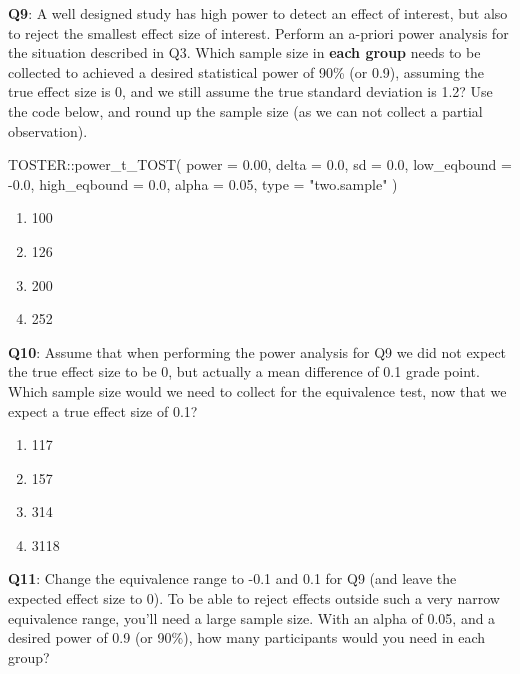 \documentclass[
  oneside]{book}
\newenvironment{Shaded}{\begin{snugshade}}{\end{snugshade}}
\newcommand{\AttributeTok}[1]{\textcolor[rgb]{0.77,0.63,0.00}{#1}}
\newcommand{\FloatTok}[1]{\textcolor[rgb]{0.00,0.00,0.81}{#1}}
\newcommand{\FunctionTok}[1]{\textcolor[rgb]{0.00,0.00,0.00}{#1}}
\newcommand{\NormalTok}[1]{#1}
\newcommand{\SpecialCharTok}[1]{\textcolor[rgb]{0.00,0.00,0.00}{#1}}
\newcommand{\StringTok}[1]{\textcolor[rgb]{0.31,0.60,0.02}{#1}}
\providecommand{\tightlist}{%
  \setlength{\itemsep}{0pt}\setlength{\parskip}{0pt}}
\begin{document}
\textbf{Q9}: A well designed study has high power to detect an effect of interest, but also to reject the smallest effect size of interest. Perform an a-priori power analysis for the situation described in Q3. Which sample size in \textbf{each group} needs to be collected to achieved a desired statistical power of 90\% (or 0.9), assuming the true effect size is 0, and we still assume the true standard deviation is 1.2? Use the code below, and round up the sample size (as we can not collect a partial observation).

\begin{Shaded}
\begin{Highlighting}[]
\NormalTok{TOSTER}\SpecialCharTok{::}\FunctionTok{power\_t\_TOST}\NormalTok{(}
  \AttributeTok{power =} \FloatTok{0.00}\NormalTok{,}
  \AttributeTok{delta =} \FloatTok{0.0}\NormalTok{,}
  \AttributeTok{sd =} \FloatTok{0.0}\NormalTok{,}
  \AttributeTok{low\_eqbound =} \SpecialCharTok{{-}}\FloatTok{0.0}\NormalTok{,}
  \AttributeTok{high\_eqbound =} \FloatTok{0.0}\NormalTok{,}
  \AttributeTok{alpha =} \FloatTok{0.05}\NormalTok{,}
  \AttributeTok{type =} \StringTok{"two.sample"}
\NormalTok{)}
\end{Highlighting}
\end{Shaded}

\begin{enumerate}
\def\labelenumi{\Alph{enumi})}
\tightlist
\item
  100
\item
  126
\item
  200
\item
  252
\end{enumerate}

\textbf{Q10}: Assume that when performing the power analysis for Q9 we did not expect the true effect size to be 0, but actually a mean difference of 0.1 grade point. Which sample size would we need to collect for the equivalence test, now that we expect a true effect size of 0.1?

\begin{enumerate}
\def\labelenumi{\Alph{enumi})}
\tightlist
\item
  117
\item
  157
\item
  314
\item
  3118
\end{enumerate}

\textbf{Q11}: Change the equivalence range to -0.1 and 0.1 for Q9 (and leave the expected effect size to 0). To be able to reject effects outside such a very narrow equivalence range, you'll need a large sample size. With an alpha of 0.05, and a desired power of 0.9 (or 90\%), how many participants would you need in each group?
\end{document}
